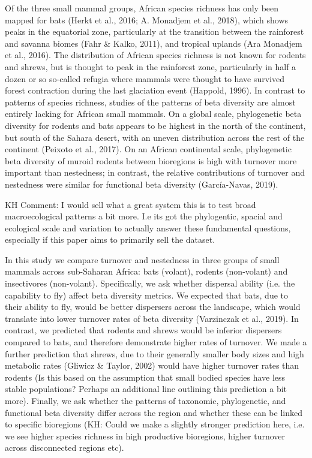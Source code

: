 \documentclass{article}
\begin{document}
\vspace{5mm}
Of the three small mammal groups, African species richness has only been mapped for bats (Herkt et al., 2016; A. Monadjem et al., 2018), which shows peaks in the equatorial zone, particularly at the transition between the rainforest and savanna biomes (Fahr \& Kalko, 2011), and tropical uplands (Ara Monadjem et al., 2016). The distribution of African species richness is not known for rodents and shrews, but is thought to peak in the rainforest zone, particularly in half a dozen or so so-called refugia where mammals were thought to have survived forest contraction during the last glaciation event (Happold, 1996). In contrast to patterns of species richness, studies of the patterns of beta diversity are almost entirely lacking for African small mammals. On a global scale, phylogenetic beta diversity for rodents and bats appears to be highest in the north of the continent, but south of the Sahara desert, with an uneven distribution across the rest of the continent (Peixoto et al., 2017). On an African continental scale, phylogenetic beta diversity of muroid rodents between bioregions is high with turnover more important than nestedness; in contrast, the relative contributions of turnover and nestedness were similar for functional beta diversity (García-Navas, 2019). 

\vspace{5mm}

KH Comment: I would sell what a great system this is to test broad macroecological patterns a bit more. I.e its got the phylogentic, spacial and ecological scale and variation to actually answer these fundamental questions, especially if this paper aims to primarily sell the dataset.

\vspace{5mm}



\vspace{5mm}
In this study we compare turnover and nestedness in three groups of small mammals across sub-Saharan Africa: bats (volant), rodents (non-volant) and insectivores (non-volant). Specifically, we ask whether dispersal ability (i.e. the capability to fly) affect beta diversity metrics. We expected that bats, due to their ability to fly, would be better dispersers across the landscape, which would translate into lower turnover rates of beta diversity (Varzinczak et al., 2019). In contrast, we predicted that rodents and shrews would be inferior dispersers compared to bats, and therefore demonstrate higher rates of turnover. We made a further prediction that shrews, due to their generally smaller body sizes and high metabolic rates (Gliwicz \& Taylor, 2002) would have higher turnover rates than rodents (Is this based on the assumption that small bodied species have less stable populations? Perhaps an additional line outlining this prediction a bit more). Finally, we ask whether the patterns of taxonomic, phylogenetic, and functional beta diversity differ across the region and whether these can be linked to specific bioregions (KH: Could we make a slightly stronger prediction here, i.e. we see higher species richness in high productive bioregions, higher turnover across disconnected regions etc).
\end{document}
